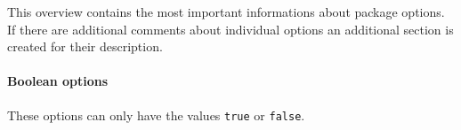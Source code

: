 \documentclass[%
  type=article,%
  layout=koma,%
  page=false,%
  cleveref=true,%
  conditionallox=true,%
  conditionalloxnewpage=true,%
  date=true,%
  glossaries=true,%
  hyperref=true,%
  index=true,%
  listings=true%
]{stmtext}
\newcommand{\stmlatexpackagelink}[1]{\href{https://github.com/raedma/stmlatex/blob/master/doc/#1/#1.pdf}{\texttt{#1}}}
\begin{document}

This overview contains the most important informations about package options. If there are additional comments about individual options an additional section is created for their description.

\paragraph{Boolean options}

These options can only have the values \texttt{true} or \texttt{false}.

\end{document}
